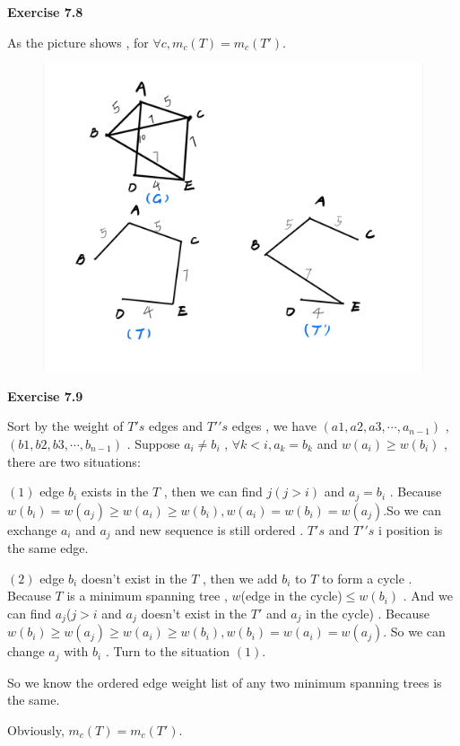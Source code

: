 \documentclass{article} %
\begin{document}
	\textbf{Exercise 7.8}\par
    As the picture shows , for $\forall c,m_c(T)=m_c(T\prime)$.
    \begin{figure}[H]
		\centering
		\includegraphics[scale=0.3]{p3.jpg}
		\caption{}
		\label{fig:2}
	\end{figure}

  

	\textbf{Exercise 7.9}\par
    Sort by the weight of $T's$ edges and $T\prime's$ edges , we have $(a1,a2,a3,\cdots,a_{n-1})$ , $(b1,b2,b3,\cdots,b_{n-1})$ . Suppose $a_i\ne b_i$ , $\forall k<i,a_k=b_k$ and $w(a_i)\geq w(b_i)$ , there are two situations:\par
    $(1)$ edge $b_i$ exists in the $T$ , then we can find $j(j>i)$ and $a_j=b_i$ . Because $w(b_i)=w(a_j)\geq w(a_i)\geq w(b_i) , w(a_i)=w(b_i)=w(a_j) . $So we can exchange $a_i$ and $a_j$ and new sequence is still ordered . $T's$ and $T\prime's$ i position is the same edge.\par
    $(2)$ edge $b_i$ doesn't exist in the $T$ , then we add $b_i$ to $T$ to form a cycle . Because $T$ is a minimum spanning tree , $w$(edge in the cycle)$\leq w(b_i)$ . And we can find $a_j$($j>i$ and $a_j$ doesn't exist in the $T\prime$ and $a_j$ in the cycle) . Because $w(b_i)\geq w(a_j)\geq w(a_i) \geq w(b_i),w(b_i)=w(a_i)=w(a_j).$ So we can change $a_j$ with $b_i$ . Turn to the situation $(1)$.\par
    So we know the ordered edge weight list of any two minimum spanning trees is the same.\par
    Obviously, $m_c(T)=m_c(T\prime).$
\end{document}
